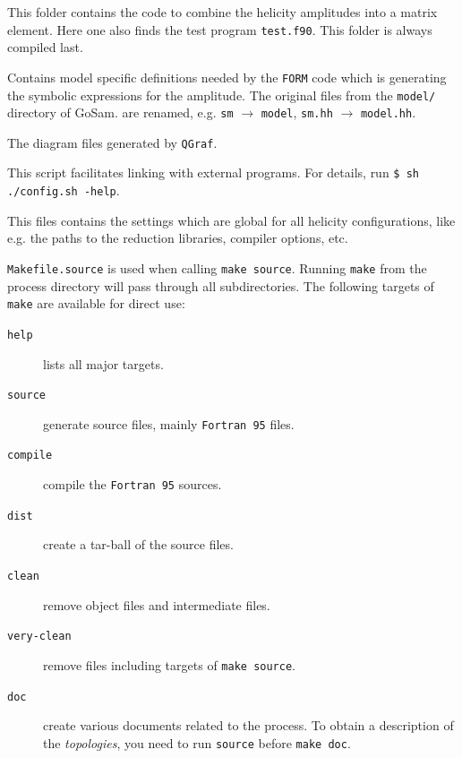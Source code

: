 \documentclass[11pt,a4paper]{refrep}
\newcommand{\gosamversion}{{2{.}0}}
\newcommand{\gosamv}[1][\gosamversion]{{\sc GoSam}\xspace}
\newcommand{\qgraf}{{\tt QGraf}\xspace}
\newcommand{\form}{{\tt FORM}\xspace}
\newcommand{\fortranXC}{{\tt Fortran\,95}\xspace}
\begin{document}
 This folder contains the code to combine
the helicity amplitudes into a matrix element. Here one also finds
the test program \texttt{test.f90}. This folder is always compiled last.

Contains model specific definitions needed by the \form code
which is generating the symbolic expressions for the amplitude.
The original files from the \texttt{model/} directory of \gosamv. 
are renamed, e.g.
\texttt{sm} $\to$ \texttt{model}, \texttt{sm.hh} $\to$ \texttt{model.hh}.

 The diagram files generated
by \qgraf.

 This script facilitates linking with external
programs. For details, run
{\tt \$ sh ./config.sh -help}.


 This files contains the settings
which are global for all helicity configurations, 
like e.g. the paths to the reduction libraries, compiler options, etc.

 \texttt{Makefile.source} is used when calling
\texttt{make source}. Running \texttt{make} from the process
directory will pass through all subdirectories. The following
targets of \texttt{make} are available for direct use:
\begin{description}
\item[\texttt{help}] lists all major targets.
\item[\texttt{source}] generate source files, mainly \fortranXC files.
\item[\texttt{compile}] compile the \fortranXC sources.
\item[\texttt{dist}] create a tar-ball of the source files.
\item[\texttt{clean}] remove object files and intermediate files.
\item[\texttt{very-clean}] remove files including targets of
                                \texttt{make source}.
\item[\texttt{doc}] create various documents related to the process.
      To obtain a description of the \emph{topologies}, you need to run
      \texttt{source} before \texttt{make doc}.
\end{description}
\end{document}
